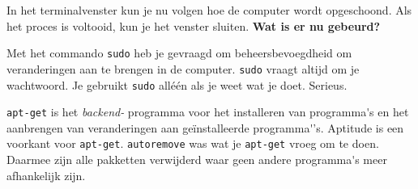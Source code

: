 \documentclass[12pt,a4paper]{article}
\begin{document}
In het terminalvenster kun je nu volgen hoe de computer wordt opgeschoond. Als het proces is voltooid, kun je het venster sluiten. 
\textbf{Wat is er nu gebeurd?}

Met het commando \texttt{sudo} heb je gevraagd om beheersbevoegdheid om veranderingen aan te brengen in de computer. \texttt{sudo} vraagt altijd om je wachtwoord. Je gebruikt \texttt{sudo} all\'{e}\'{e}n als je weet wat je doet. Serieus. 

\texttt{apt-get} is het \textit{backend-} programma voor het installeren van programma\'{}s en het  aanbrengen van veranderingen aan ge\"{i}nstalleerde programma\'{}'s. Aptitude is een voorkant voor \texttt{apt-get}. \texttt{autoremove} was wat je \texttt{apt-get} vroeg om te doen. Daarmee zijn alle pakketten verwijderd waar geen andere programma\'{}s meer afhankelijk zijn.
\end{document}
